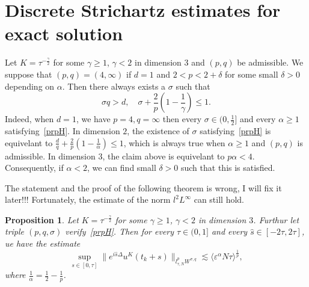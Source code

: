 \documentclass[10pt,a4paper]{article}
\newtheorem{proposition}[theorem]{Proposition}
\begin{document}
  \section{Discrete Strichartz estimates for exact solution}


  Let \(K=\tau^{-\frac\gamma2}\) for some \(\gamma\geq1\), \(\gamma<2\) in
  dimension \(3\) and \((p,q)\) be admissible. We suppose that \((p,q)=(4,\infty)\) if
  \(d=1\) and \(2<p<2+\delta\) for some small \(\delta>0\) depending on \(\alpha\).
  Then there always exists a \(\sigma\) such that 
  \begin{equation}\label{prpH}
    \sigma q > d, \quad \sigma + \frac2p \left( 1-\frac1\gamma \right) \leq 1.
  \end{equation}
  Indeed, when \(d=1\), we have \(p=4,q=\infty\) then every \(\sigma \in
  (0,\frac12] \) and every \(\alpha\geq1\) satisfying~\eqref{prpH}. In dimension
  \(2\), the existence of \(\sigma\) satisfying~\eqref{prpH} is equivelant to
  \( \frac dq +\frac2p (1-\frac1\alpha) \leq 1 \), which is always true when
  \(\alpha \geq 1\) and \((p,q)\) is admissible. In dimension \(3\), the claim
  above is equivelant to \(p\alpha < 4\). Consequently, if \(\alpha<2\), we can
  find small \(\delta>0\) such that this is satisfied.


  The statement and the proof of the following theorem is wrong, I will fix it
  later!!!
  Fortunately, the estimate of the norm \(l^2L^\infty\) can still hold.

  \begin{proposition}\label{uKlpLq}
    Let \(K = \tau^{-\frac\gamma2}\) for some \(\gamma\geq1\), \(\gamma<2\)
    in dimension \(3\). Furthur let triple \((p,q,\sigma)\) verify~\eqref{prpH}.
    Then for every \( \tau \in (0,1] \) and every \(\hat{s} \in 
    [-2\tau,2\tau] \), ue have the estimate
    \begin{equation}
      \sup_{s\in[0,\tau]} \|e^{i\hat{s}\Delta}u^K(t_k+s)\|_{l^p_{\tau,N} W^{\sigma,q}}
      \lesssim \langle\varepsilon^\alpha N\tau\rangle^\frac1p,
    \end{equation}
    where \(\frac1\alpha = \frac12 - \frac1p\).
  \end{proposition}
  
\end{document}
